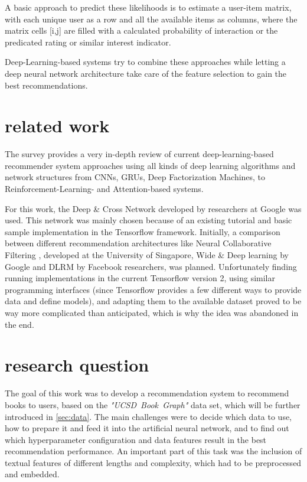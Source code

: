 \documentclass[10pt,final,journal,a4paper,oneside,twocolumn]{IEEEtran}
\begin{document}
A basic approach to predict these likelihoods is to estimate a user-item matrix, with each unique user as a row and all the available items as columns, where the matrix cells [i,j] are filled with a calculated probability of interaction or the predicated rating or similar interest indicator. 

Deep-Learning-based systems try to combine these approaches while letting a deep neural network architecture take care of the feature selection to gain the best recommendations.

\section{related work}
The survey \cite{Zhang.2020} provides a very in-depth review of current deep-learning-based recommender system approaches using all kinds of deep learning algorithms and network structures from CNNs, GRUs, Deep Factorization Machines, to Reinforcement-Learning- and Attention-based systems.

For this work, the Deep \& Cross Network \cite{Wang.2017} \cite{Wang.2021} developed by researchers at Google was used. This network was mainly chosen because of an existing tutorial and basic sample implementation in the Tensorflow framework.
Initially, a comparison between different recommendation architectures like Neural Collaborative Filtering \cite{He.2017}, developed at the University of Singapore, Wide \& Deep learning \cite{Cheng.2016} by Google and DLRM \cite{Naumov.31.05.2019} by Facebook researchers, was planned.
Unfortunately finding running implementations in the current Tensorflow version 2, using similar programming interfaces (since Tensorflow provides a few different ways to provide data and define models), and adapting them to the available dataset proved to be way more complicated than anticipated, which is why the idea was abandoned in the end.


\section{research question}
The goal of this work was to develop a recommendation system to recommend books to users, based on the \emph{"UCSD~Book~Graph"} data set, which will be further introduced in \autoref{sec:data}. The main challenges were to decide which data to use, how to prepare it and feed it into the artificial neural network, and to find out which hyperparameter configuration and data features result in the best recommendation performance.
An important part of this task was the inclusion of textual features of different lengths and complexity, which had to be preprocessed and embedded.
\end{document}
